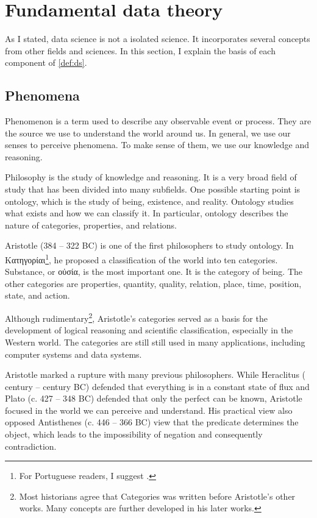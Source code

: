 \section{Fundamental data theory}

As I stated, data science is not a isolated science.  It incorporates several concepts
from other fields and sciences.  In this section, I explain the basis of each component of
\cref{def:ds}.

\subsection{Phenomena}
\label{sub:phenomena}

Phenomenon is a term used to describe any observable event or process.  They are the
source we use to understand the world around us.  In general, we use our senses to
perceive phenomena.  To make sense of them, we use our knowledge and reasoning.

Philosophy is the study of knowledge and reasoning.  It is a very broad field of study
that has been divided into many subfields.  One possible starting point is \gls{ontology},
which is the study of being, existence, and reality.  Ontology studies what exists and how
we can classify it.  In particular, ontology describes the nature of categories,
properties, and relations.

Aristotle (384 -- 322 BC) is one of the first philosophers to study ontology. In
Κατηγορίαι\footnote{For Portuguese readers, I suggest .}, he
proposed a classification of the world into ten categories. Substance, or οὐσία,
is the most important one.  It is the category of being.  The other categories
are properties, quantity, quality, relation, place, time, position, state, and action.

Although rudimentary\footnote{Most historians agree that Categories was written before
Aristotle's other works.  Many concepts are further developed in his later works.},
Aristotle's categories served as a basis for the development of logical reasoning and
scientific classification, especially in the Western world.  The categories are still
still used in many applications, including computer systems and data systems.

Aristotle marked a rupture with many previous philosophers.  While Heraclitus (
century --  century BC) defended that everything is in a constant state of flux and
Plato (c. 427 -- 348 BC) defended that only the perfect can be known, Aristotle focused in
the world we can perceive and understand.  His practical view also opposed Antisthenes (c.
446 -- 366 BC) view that the predicate determines the object, which leads to the
impossibility of negation and consequently contradiction.


